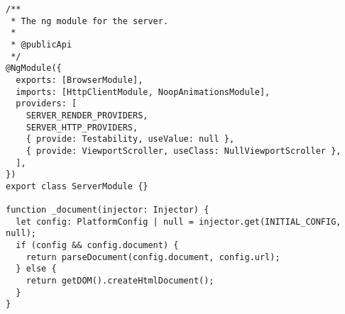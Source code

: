 \begin{verbatim}
/**
 * The ng module for the server.
 *
 * @publicApi
 */
@NgModule({
  exports: [BrowserModule],
  imports: [HttpClientModule, NoopAnimationsModule],
  providers: [
    SERVER_RENDER_PROVIDERS,
    SERVER_HTTP_PROVIDERS,
    { provide: Testability, useValue: null },
    { provide: ViewportScroller, useClass: NullViewportScroller },
  ],
})
export class ServerModule {}

function _document(injector: Injector) {
  let config: PlatformConfig | null = injector.get(INITIAL_CONFIG, null);
  if (config && config.document) {
    return parseDocument(config.document, config.url);
  } else {
    return getDOM().createHtmlDocument();
  }
}
\end{verbatim}
